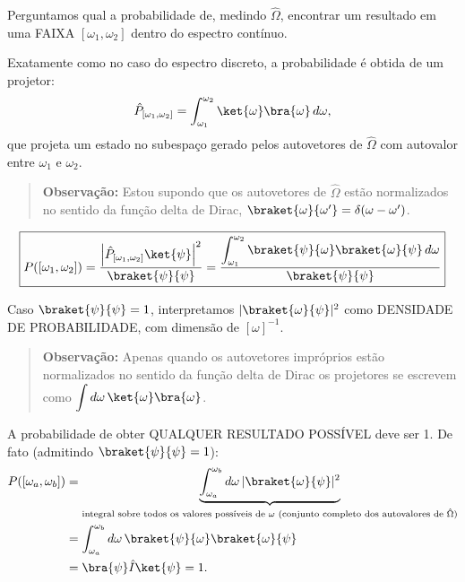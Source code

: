 \begin{center}
\end{center}

Perguntamos qual a probabilidade de, medindo $\hat{\Omega}$, encontrar um resultado em uma FAIXA $[\omega_1,\omega_2]$ dentro do espectro contínuo.

Exatamente como no caso do espectro discreto, a probabilidade é obtida de um projetor:
\begin{equation}
\hat{P}_{[\omega_1,\omega_2]} = \int_{\omega_1}^{\omega_2} \ket{\omega}\bra{\omega}\, d\omega,
\end{equation}
que projeta um estado no subespaço gerado pelos autovetores de $\hat{\Omega}$ com autovalor entre $\omega_1$ e $\omega_2$.

\begin{quote}
\textbf{Observação:} Estou supondo que os autovetores de $\hat{\Omega}$ estão normalizados no sentido da função delta de Dirac, $\braket{\omega}{\omega'} = \delta(\omega-\omega')$.
\end{quote}

\begin{equation}
\label{eq:aula11_prob_continua}
\boxed{P([\omega_1,\omega_2]) = \frac{\left|\hat{P}_{[\omega_1,\omega_2]}\ket{\psi}\right|^2}{\braket{\psi}{\psi}} = \frac{\displaystyle\int_{\omega_1}^{\omega_2} \braket{\psi}{\omega}\braket{\omega}{\psi}\, d\omega}{\braket{\psi}{\psi}}}
\end{equation}

Caso $\braket{\psi}{\psi} = 1$, interpretamos $|\braket{\omega}{\psi}|^2$ como DENSIDADE DE PROBABILIDADE, com dimensão de $[\omega]^{-1}$.

\begin{quote}
\textbf{Observação:} Apenas quando os autovetores impróprios estão normalizados no sentido da função delta de Dirac os projetores se escrevem como $\displaystyle\int d\omega\, \ket{\omega}\bra{\omega}$.
\end{quote}

A probabilidade de obter QUALQUER RESULTADO POSSÍVEL deve ser 1. De fato (admitindo $\braket{\psi}{\psi}=1$):
\begin{align}
P([\omega_a,\omega_b]) &= \underbrace{\int_{\omega_a}^{\omega_b} d\omega\, |\braket{\omega}{\psi}|^2}_{\text{integral sobre todos os valores possíveis de }\omega \text{ (conjunto completo dos autovalores de }\hat{\Omega}\text{)}}\\
&= \int_{\omega_a}^{\omega_b} d\omega\, \braket{\psi}{\omega}\braket{\omega}{\psi}\\
&= \bra{\psi}\hat{I}\ket{\psi} = 1.
\end{align}

